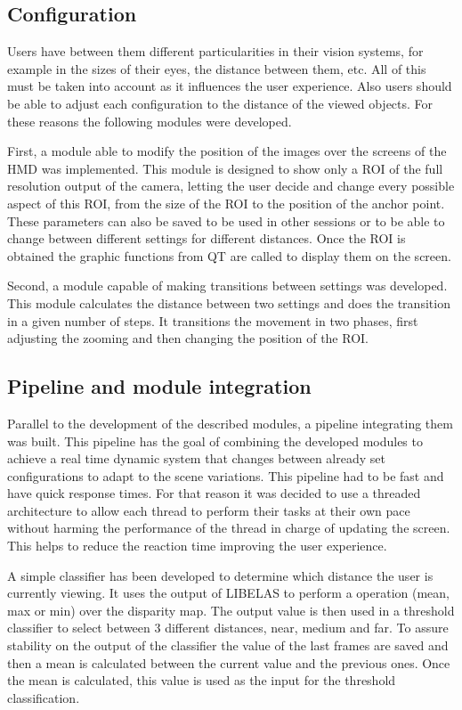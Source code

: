 \documentclass[10pt,a4paper,twocolumn,twoside]{article}
\begin{document}
	 
	\subsection{Configuration}
	
	Users have between them different particularities in their vision systems, for example in the sizes of their eyes, the distance between them, etc. All of this must be taken into account as it influences the user experience. Also users should be able to adjust each configuration to the distance of the viewed objects.  For these reasons the following modules were developed.
	
	First, a module able to modify the position of the images over the screens of the HMD was implemented. This module is designed to show only a ROI of the full resolution output of the camera, letting the user decide and change every possible aspect of this ROI, from the size of the ROI to the position of the anchor point. These parameters can also be saved to be used in other sessions or to be able to change between different settings for different distances. Once the ROI is obtained the graphic functions from QT are called to display them on the screen.
	
	Second, a module capable of making transitions between settings was developed. This module calculates the distance between two settings and does the transition in a given number of steps. It transitions the movement in two phases, first adjusting the zooming and then changing the position of the ROI.
	
	\subsection{Pipeline and module integration}
	\label{sec:pipeline}
	
	Parallel to the development of the described modules, a pipeline integrating them was built. This pipeline has the goal of combining the developed modules to achieve a real time dynamic system that changes between already set configurations to adapt to the scene variations. This pipeline had to be fast and have quick response times. For that reason it was decided to use a threaded architecture to allow each thread to perform their tasks at their own pace without harming the performance of the thread in charge of updating the screen. This helps to reduce the reaction time improving the user experience. 
	
	A simple classifier has been developed to determine which distance the user is currently viewing. It uses the output of LIBELAS to perform a operation (mean, max or min) over the disparity map. The output value is then used in a threshold classifier to select between 3 different distances, near, medium and far. 
	To assure stability on the output of the classifier the value of the last frames are saved and then a mean is calculated between the current value and the previous ones. Once the mean is calculated, this value is used as the input for the threshold classification. 
	
\end{document}
